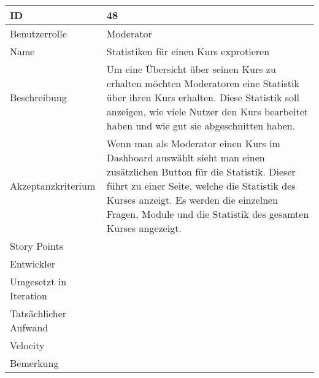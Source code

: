 \begin{tabularx}{\textwidth}{|p{}|X|}
	\hline
	ID & 48\\
	\hline
	Benutzerrolle & Moderator\\
	\hline
	Name & Statistiken für einen Kurs exprotieren\\
	\hline
	Beschreibung & Um eine Übersicht über seinen Kurs zu erhalten möchten Moderatoren eine Statistik über ihren Kurs erhalten. Diese Statistik soll anzeigen, wie viele Nutzer den Kurs bearbeitet haben und wie gut sie abgeschnitten haben.\\
	\hline
	Akzeptanzkriterium & Wenn man als Moderator einen Kurs im Dashboard auswählt sieht man einen zusätzlichen Button für die Statistik. Dieser führt zu einer Seite, welche die Statistik des Kurses anzeigt. Es werden die einzelnen Fragen, Module und die Statistik des gesamten Kurses angezeigt.\\
	\hline
	Story Points & \\
	\hline
	Entwickler & \\
	\hline
	Umgesetzt in Iteration & \\
	\hline
	Tatsächlicher Aufwand & \\
	\hline
	Velocity & \\
	\hline
	Bemerkung & \\
	\hline
\end{tabularx}
\vspace{20pt}
